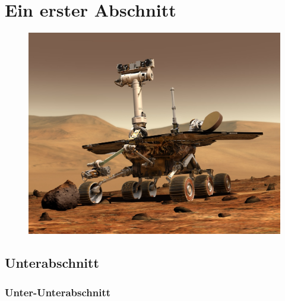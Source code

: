 









	
			
	\section{Ein erster Abschnitt}
	
	\thispagestyle{headings}	
	
	
	\blindtext[5]
	
	
	
	\markright{\@\hsmaautor: \@\shorttitle}
	\thispagestyle{headings}
	
	
	
	
	
	
	\begin{figure}[th]
		\centering
		\includegraphics[width=0.7\linewidth]{bilder/nasa_rover}
		\caption{}
		\label{fig:nasarover}
	\end{figure}
	
	\cite{Kornmeier2011}
	\blindtext[4]
	\subsection{Unterabschnitt}
	
	\blindtext[5]
	
	\subsubsection{Unter-Unterabschnitt}
	

